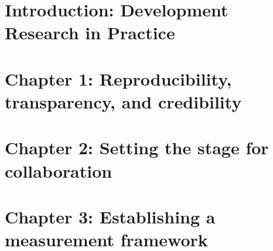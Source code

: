 %
%
%
%




\cleardoublepage
\chapter{Introduction: Development Research in Practice}





\chapter{Chapter 1: Reproducibility, transparency, and credibility}
\label{ch:1}




\chapter{Chapter 2: Setting the stage for collaboration}
\label{ch:2}





\chapter{Chapter 3: Establishing a measurement framework}
\label{ch:3}

